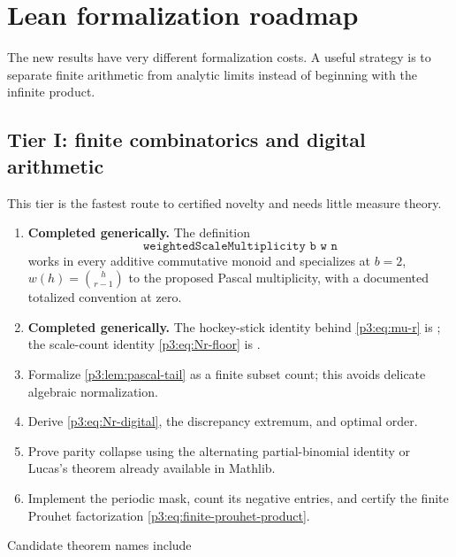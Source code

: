 \documentclass[11pt,oneside]{article}
\theoremstyle{definition}
\theoremstyle{remark}
\begin{document}
\section{Lean formalization roadmap}\label{p3:sec:lean}

The new results have very different formalization costs.  A useful strategy is to separate finite arithmetic from analytic limits instead of beginning with the infinite product.

\subsection{Tier I: finite combinatorics and digital arithmetic}

This tier is the fastest route to certified novelty and needs little measure theory.

\begin{enumerate}[label=\textbf{I.\arabic*}]
\item \textbf{Completed generically.}  The definition
\[
 \texttt{weightedScaleMultiplicity b w n}
\]
works in every additive commutative monoid and specializes at
$b=2$, $w(h)=\binom h{r-1}$ to the proposed Pascal multiplicity, with a
documented totalized convention at zero.
\item \textbf{Completed generically.}  The hockey-stick identity behind
\eqref{p3:eq:mu-r} is ; the scale-count
identity \eqref{p3:eq:Nr-floor} is .
\item Formalize \cref{p3:lem:pascal-tail} as a finite subset count; this avoids delicate algebraic normalization.
\item Derive \eqref{p3:eq:Nr-digital}, the discrepancy extremum, and optimal order.
\item Prove parity collapse using the alternating partial-binomial identity or Lucas's theorem already available in Mathlib.
\item Implement the periodic mask, count its negative entries, and certify the finite Prouhet factorization \eqref{p3:eq:finite-prouhet-product}.
\end{enumerate}

Candidate theorem names include
\begin{center}
\begin{minipage}{0.88\textwidth}
\small
{}\\
\\
\\
\\
\\
\end{minipage}
\end{center}
\end{document}

